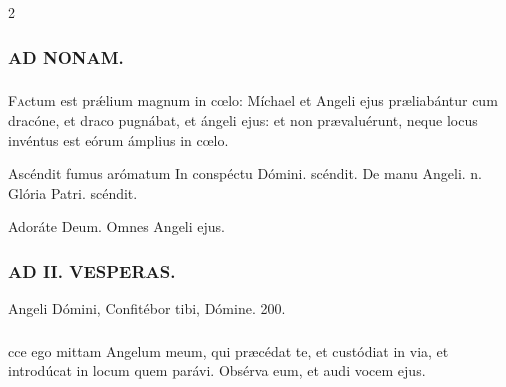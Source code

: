 \documentclass[9pt,twoside]{extarticle}
\begin{document}
\begin{multicols}{2}
\subsubsection*{\center \textsc{AD NONAM.}}
\subsubsection*{}
\lettrine{F}actum est prǽlium magnum in cœlo: Míchael et Angeli ejus præliabántur cum dracóne, et draco pugnábat, et ángeli ejus: et non prævaluérunt, neque locus invéntus est eórum ámplius in cœlo.

\begin{tightlist}{}
\item {} Ascéndit fumus arómatum \textred{*} In conspéctu Dómini. scéndit.  De manu Angeli. n. Glória Patri. scéndit.
\item {} Adoráte Deum.  Omnes Angeli ejus.
\end{tightlist}

\subsubsection*{\center \textsc{AD II. VESPERAS.}}
\begin{tightlist}{}
\item {} Angeli Dómini,  Confitébor tibi, Dómine. 200.
\end{tightlist}

\subsubsection*{}
cce ego mittam Angelum meum, qui præcédat te, et custódiat in via, et introdúcat in locum quem parávi. Obsérva eum, et audi vocem ejus.


\end{multicols}
\end{document}
